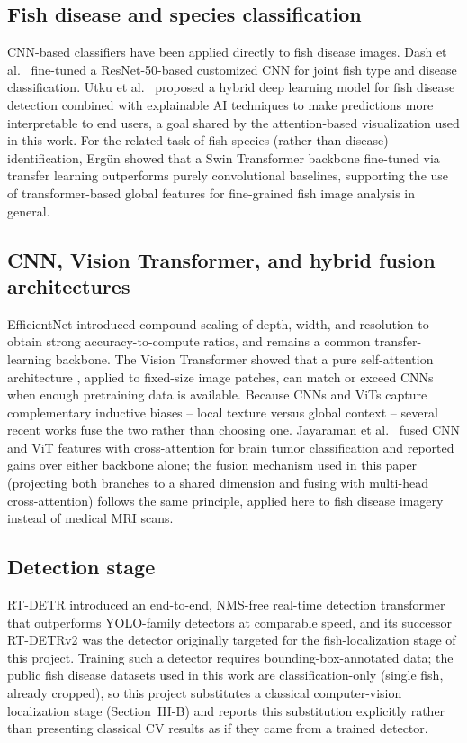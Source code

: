 \documentclass[conference]{IEEEtran}
\begin{document}
\subsection{Fish disease and species classification}
CNN-based classifiers have been applied directly to fish disease images. Dash et al.\ \cite{dash2024} fine-tuned a ResNet-50-based customized CNN for joint fish type and disease classification. Utku et al.\ \cite{utku2026} proposed a hybrid deep learning model for fish disease detection combined with explainable AI techniques to make predictions more interpretable to end users, a goal shared by the attention-based visualization used in this work. For the related task of fish species (rather than disease) identification, Ergün \cite{ergun2025} showed that a Swin Transformer backbone fine-tuned via transfer learning outperforms purely convolutional baselines, supporting the use of transformer-based global features for fine-grained fish image analysis in general.

\subsection{CNN, Vision Transformer, and hybrid fusion architectures}
EfficientNet \cite{efficientnet2019} introduced compound scaling of depth, width, and resolution to obtain strong accuracy-to-compute ratios, and remains a common transfer-learning backbone. The Vision Transformer \cite{vit2021} showed that a pure self-attention architecture \cite{attention2017}, applied to fixed-size image patches, can match or exceed CNNs when enough pretraining data is available. Because CNNs and ViTs capture complementary inductive biases -- local texture versus global context -- several recent works fuse the two rather than choosing one. Jayaraman et al.\ \cite{jayaraman2025} fused CNN and ViT features with cross-attention for brain tumor classification and reported gains over either backbone alone; the fusion mechanism used in this paper (projecting both branches to a shared dimension and fusing with multi-head cross-attention) follows the same principle, applied here to fish disease imagery instead of medical MRI scans.

\subsection{Detection stage}
RT-DETR \cite{rtdetr2023} introduced an end-to-end, NMS-free real-time detection transformer that outperforms YOLO-family detectors at comparable speed, and its successor RT-DETRv2 was the detector originally targeted for the fish-localization stage of this project. Training such a detector requires bounding-box-annotated data; the public fish disease datasets used in this work are classification-only (single fish, already cropped), so this project substitutes a classical computer-vision localization stage (Section~III-B) and reports this substitution explicitly rather than presenting classical CV results as if they came from a trained detector.
\end{document}
